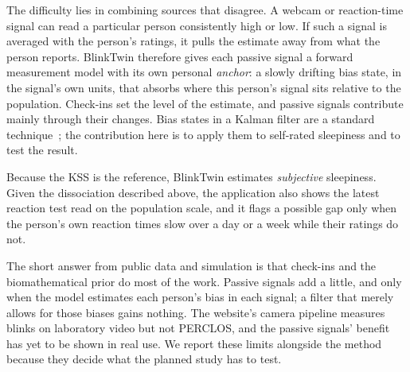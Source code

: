 The difficulty lies in combining sources that disagree. A webcam or reaction-time signal can read a particular person consistently high or low. If such a signal is averaged with the person's ratings, it pulls the estimate away from what the person reports. BlinkTwin therefore gives each passive signal a forward measurement model with its own personal \emph{anchor}: a slowly drifting bias state, in the signal's own units, that absorbs where this person's signal sits relative to the population. Check-ins set the level of the estimate, and passive signals contribute mainly through their changes. Bias states in a Kalman filter are a standard technique~\cite{friedland1969treatment}; the contribution here is to apply them to self-rated sleepiness and to test the result.

Because the KSS is the reference, BlinkTwin estimates \emph{subjective} sleepiness. Given the dissociation described above, the application also shows the latest reaction test read on the population scale, and it flags a possible gap only when the person's own reaction times slow over a day or a week while their ratings do not.

The short answer from public data and simulation is that check-ins and the biomathematical prior do most of the work. Passive signals add a little, and only when the model estimates each person's bias in each signal; a filter that merely allows for those biases gains nothing. The website's camera pipeline measures blinks on laboratory video but not PERCLOS, and the passive signals' benefit has yet to be shown in real use. We report these limits alongside the method because they decide what the planned study has to test.

